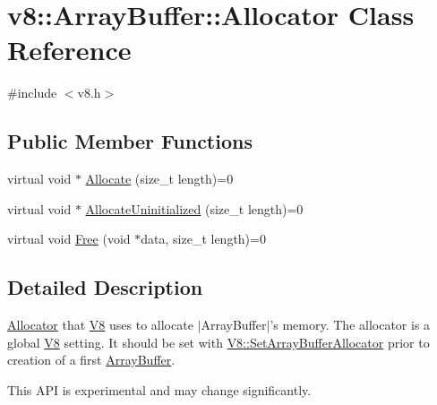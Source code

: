 \hypertarget{classv8_1_1ArrayBuffer_1_1Allocator}{\section{v8\-:\-:Array\-Buffer\-:\-:Allocator Class Reference}
\label{classv8_1_1ArrayBuffer_1_1Allocator}
}


{\ttfamily \#include $<$v8.\-h$>$}

\subsection*{Public Member Functions}
\begin{DoxyCompactItemize}
\item 
virtual void $\ast$ \hyperlink{classv8_1_1ArrayBuffer_1_1Allocator_a106b0d80120ed04fe9b9675e96f0340b}{Allocate} (size\-\_\-t length)=0
\item 
virtual void $\ast$ \hyperlink{classv8_1_1ArrayBuffer_1_1Allocator_a92b2d5c0a826d3c435e12f3ee178f37a}{Allocate\-Uninitialized} (size\-\_\-t length)=0
\item 
virtual void \hyperlink{classv8_1_1ArrayBuffer_1_1Allocator_a419f59d2a103a5a8863809d7977c9cd8}{Free} (void $\ast$data, size\-\_\-t length)=0
\end{DoxyCompactItemize}


\subsection{Detailed Description}
\hyperlink{classv8_1_1ArrayBuffer_1_1Allocator}{Allocator} that \hyperlink{classv8_1_1V8}{V8} uses to allocate $|$\-Array\-Buffer$|$'s memory. The allocator is a global \hyperlink{classv8_1_1V8}{V8} setting. It should be set with \hyperlink{classv8_1_1V8_abc40950a39f8cb6946dc8a1ad41eea84}{V8\-::\-Set\-Array\-Buffer\-Allocator} prior to creation of a first \hyperlink{classv8_1_1ArrayBuffer}{Array\-Buffer}.

This A\-P\-I is experimental and may change significantly. 


